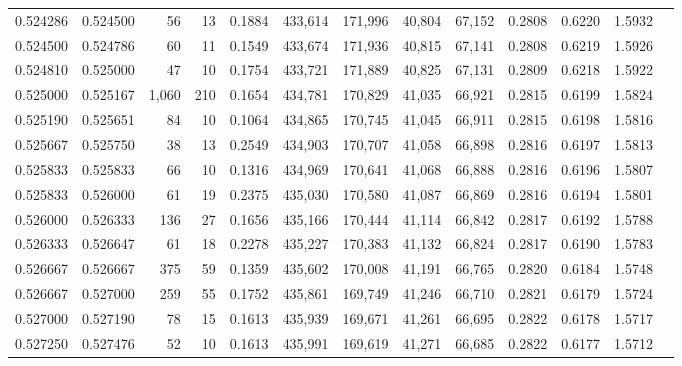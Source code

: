\begin{tabular}{rrrrrrrrrrrrr}
0.524286 & 0.524500 &    56 &  13 &                                     0.1884 & 433,614 & 171,996 &  40,804 &  67,152 & 0.2808 & 0.6220 & 1.5932 \\
0.524500 & 0.524786 &    60 &  11 &                                     0.1549 & 433,674 & 171,936 &  40,815 &  67,141 & 0.2808 & 0.6219 & 1.5926 \\
0.524810 & 0.525000 &    47 &  10 &                                     0.1754 & 433,721 & 171,889 &  40,825 &  67,131 & 0.2809 & 0.6218 & 1.5922 \\
0.525000 & 0.525167 & 1,060 & 210 &                                     0.1654 & 434,781 & 170,829 &  41,035 &  66,921 & 0.2815 & 0.6199 & 1.5824 \\
0.525190 & 0.525651 &    84 &  10 &                                     0.1064 & 434,865 & 170,745 &  41,045 &  66,911 & 0.2815 & 0.6198 & 1.5816 \\
0.525667 & 0.525750 &    38 &  13 &                                     0.2549 & 434,903 & 170,707 &  41,058 &  66,898 & 0.2816 & 0.6197 & 1.5813 \\
0.525833 & 0.525833 &    66 &  10 &                                     0.1316 & 434,969 & 170,641 &  41,068 &  66,888 & 0.2816 & 0.6196 & 1.5807 \\
0.525833 & 0.526000 &    61 &  19 &                                     0.2375 & 435,030 & 170,580 &  41,087 &  66,869 & 0.2816 & 0.6194 & 1.5801 \\
0.526000 & 0.526333 &   136 &  27 &                                     0.1656 & 435,166 & 170,444 &  41,114 &  66,842 & 0.2817 & 0.6192 & 1.5788 \\
0.526333 & 0.526647 &    61 &  18 &                                     0.2278 & 435,227 & 170,383 &  41,132 &  66,824 & 0.2817 & 0.6190 & 1.5783 \\
0.526667 & 0.526667 &   375 &  59 &                                     0.1359 & 435,602 & 170,008 &  41,191 &  66,765 & 0.2820 & 0.6184 & 1.5748 \\
0.526667 & 0.527000 &   259 &  55 &                                     0.1752 & 435,861 & 169,749 &  41,246 &  66,710 & 0.2821 & 0.6179 & 1.5724 \\
0.527000 & 0.527190 &    78 &  15 &                                     0.1613 & 435,939 & 169,671 &  41,261 &  66,695 & 0.2822 & 0.6178 & 1.5717 \\
0.527250 & 0.527476 &    52 &  10 &                                     0.1613 & 435,991 & 169,619 &  41,271 &  66,685 & 0.2822 & 0.6177 & 1.5712 \\

\end{tabular}
